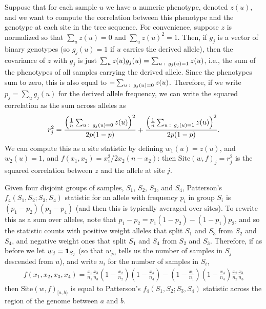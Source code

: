 \documentclass{article}
\newcommand{\site}{\mbox{Site}} %
\newcommand{\iw}{w} %
\begin{document}
\begin{example} \label{ex:site_correlations}
    Suppose that for each sample $u$ we have a numeric phenotype, denoted $z(u)$,
    and we want to compute the correlation between this phenotype
    and the genotype at each site in the tree sequence.
    For convenience, suppose $z$ is normalized so that $\sum_u z(u) = 0$ and $\sum_u z(u)^2 = 1$.
    Then, if $g_j$ is a vector of binary genotypes (so $g_j(u) = 1$ if $u$ carries the derived allele),
    then the covariance of $z$ with $g_j$ is just $\sum_u z(u) g_j(u) = \sum_{u \,\colon\, g_j(u) = 1} z(u)$,
    i.e., the sum of the phenotypes of all samples carrying the derived allele.
    Since the phenotypes sum to zero, this is also equal to 
    $- \sum_{u \,\colon\, g_j(u) = 0} z(u)$.
    Therefore, if we write $p_j = \sum_u g_j(u)$ for the derived allele frequency,
    we can write the squared correlation as the sum across alleles as
    \begin{align*}
        r_j^2 =
        \frac{\left( \frac{1}{n} \sum_{u \,\colon\, g_j(u) = 0} z(u)\right)^2}{2p(1-p)} 
        + \frac{\left( \frac{1}{n} \sum_{u \,\colon\, g_j(u) = 1} z(u)\right)^2}{2p(1-p)}  .
    \end{align*}
    We can compute this as a site statistic by defining $\iw_{1}(u) = z(u)$, and $\iw_{2}(u) = 1$,
    and $f(x_1, x_2) = x_1^2 / 2 x_2 (n - x_2)$:
    then $\site(\iw, f)_j = r_j^2$ is the squared correlation between $z$ and the allele at site $j$.
\end{example}

\begin{example}[Patterson's $f_4$] \label{ex:site_f4}
    Given four disjoint groups of samples, $S_1$, $S_2$, $S_3$, and $S_4$,
    Patterson's $f_4(S_1, S_2; S_3, S_4)$ statistic for an allele with frequency $p_i$ in group $S_i$
    is $(p_1 - p_2)(p_3 - p_4)$ (and then this is typically averaged over sites).
    To rewrite this as a sum over alleles, note that 
    $p_1 - p_2 = p_1 (1 - p_2) - (1 - p_1) p_2$,
    and so the statistic counts with positive weight
    alleles that split $S_1$ and $S_3$ from $S_2$ and $S_4$,
    and negative weight ones that split $S_1$ and $S_4$ from $S_2$ and $S_3$.
    Therefore, if as before we 
    let $\iw_j = \bone_{S_j}$
    (so that $\iw_{ju}$ tells us the number of samples in $S_j$ descended from $u$),
    and write $n_i$ for the number of samples in $S_i$,
    \begin{align*}
        f(x_1, x_2, x_3, x_4)
        =
        \frac{x_1}{n_1}
        \frac{x_3}{n_3}
        \left(1 - \frac{x_2}{n_2}\right)
        \left(1 - \frac{x_4}{n_4}\right)
        -
        \left(1 - \frac{x_1}{n_1}\right)
        \left(1 - \frac{x_4}{n_4}\right)
        \frac{x_2}{n_2}
        \frac{x_3}{n_3}
    \end{align*}
    then $\site(\iw, f)_{[a,b)}$ is equal to Patterson's $f_4(S_1, S_2; S_3, S_4)$ statistic
    across the region of the genome between $a$ and $b$.
\end{example}
\end{document}
